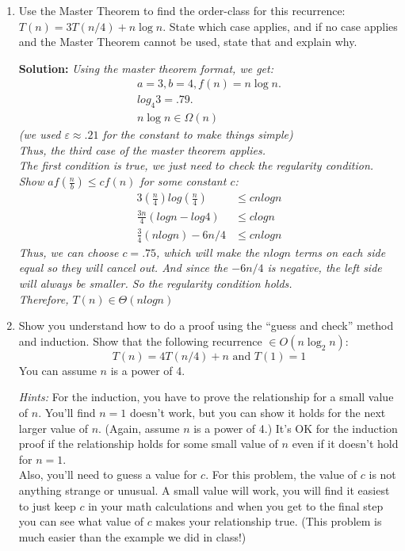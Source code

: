 \documentclass[10pt]{article}
\begin{document}
\begin{enumerate}
    	\item Use the Master Theorem to find the order-class for this recurrence: $T(n) = 3 T (n/4) + n \log n$.  State which case applies, and if no case applies and the Master Theorem cannot be used, state that and explain why.
    	
    	\textbf{Solution:} 
    	\emph{
    	Using the master theorem format, we get:
    	\begin{align*}
    	    a = 3, b = 4, f(n) = n \log n. \\
    	    log_4{3} = .79. \\
    	    n\log{n} \in \Omega(n)
    	 \end{align*}
    	 (we used $\varepsilon \approx .21$ for the constant to make things simple) \\
    	 Thus, the third case of the master theorem applies. \\
    	 The first condition is true, we just need to check the regularity condition. \\
    	 Show $af(\frac{n}{b}) \leq cf(n)$ for some constant $c$: \\
    	 \begin{align*}
        	 3(\frac{n}{4})log(\frac{n}{4}) &\leq cnlogn \\
        	 \frac{3n}{4}(logn - log4) &\leq clogn \\
        	 \frac{3}{4}(nlogn) -6n/4 &\leq cnlogn
        \end{align*}
        Thus, we can choose $c = .75$, which will make the $nlogn$ terms on each side equal so they will cancel out. And since the $-6n/4$ is negative, the left side will always be smaller. So the regularity condition holds. \\
        Therefore, $T(n) \in \Theta(nlogn)$ 
    	}
    	
    	\pagebreak
    	
    	\item Show you understand how to do a proof using the ``guess and check'' method and induction.   Show that the following recurrence $\in O(n \log_2 n)$:
    	$$T(n) = 4 T(n/4) + n \textrm{ and } T(1) = 1$$ 
    	You can assume $n$ is a power of 4.
    	
    	\emph{Hints:} For the induction, you have to prove the relationship for a small value of $n$.  You'll find $n=1$ doesn't work, but you can show it holds for the
    	next larger value of $n$.  (Again, assume $n$ is a power of 4.) It's OK for the induction proof if the relationship holds for some small value of $n$ even
    	if it doesn't hold for $n=1$.\\
    	Also, you'll need to guess a value for $c$. For this problem, the value of $c$ is not anything strange or unusual.  A small value will work, you will find it easiest to just keep $c$ in your math calculations and when you get to the final step you can see what value of $c$ makes your relationship true. 
    	(This problem is much easier than the example we did in class!) 
    	

\end{enumerate}
\end{document}
